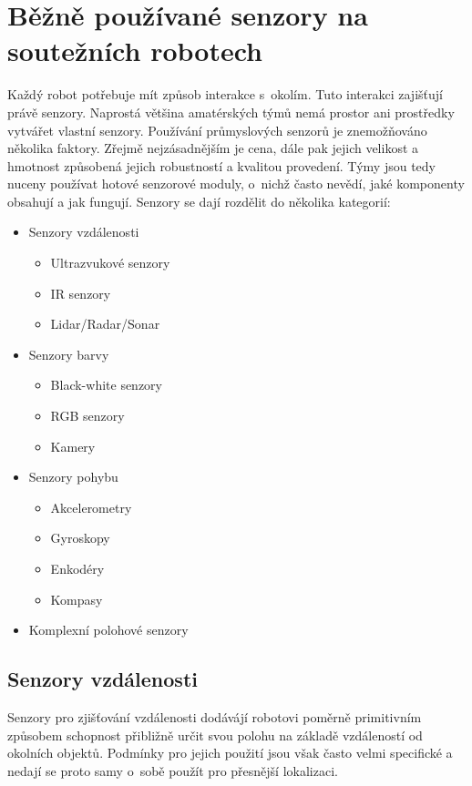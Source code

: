 \chapter{Běžně používané senzory na soutežních robotech}

Každý robot potřebuje mít způsob interakce s~okolím.
Tuto interakci zajišťují právě senzory.
Naprostá většina amatérských týmů nemá prostor ani pros\-třed\-ky vytvářet vlastní senzory.
Používání průmyslových senzorů je znemožňováno několika faktory.
Zřejmě nejzásadnějším je cena, dále pak jejich velikost a hmotnost způsobená jejich robustností a kvalitou provedení.
Týmy jsou tedy nuceny používat hotové senzorové moduly, o~nichž často nevědí, jaké komponenty obsahují a jak fungují.
Senzory se dají rozdělit do několika kategorií:
\begin{itemize}
    \item Senzory vzdálenosti
        \begin{itemize}
            \item Ultrazvukové senzory
            \item IR senzory
            \item Lidar/Radar/Sonar
        \end{itemize}
    \item Senzory barvy
        \begin{itemize}
            \item Black-white senzory
            \item RGB senzory
            \item Kamery
        \end{itemize}
    \item Senzory pohybu
        \begin{itemize}
            \item Akcelerometry
            \item Gyroskopy
            \item Enkodéry
            \item Kompasy
        \end{itemize}
    \item Komplexní polohové senzory
\end{itemize}

\section{Senzory vzdálenosti}

Senzory pro zjišťování vzdálenosti dodávájí robotovi poměrně primitivním způsobem schopnost přibližně určit svou polohu na základě vzdáleností od okolních objektů.
Podmínky pro jejich použití jsou však často velmi specifické a nedají se proto samy o~sobě použít pro přesnější lokalizaci.

